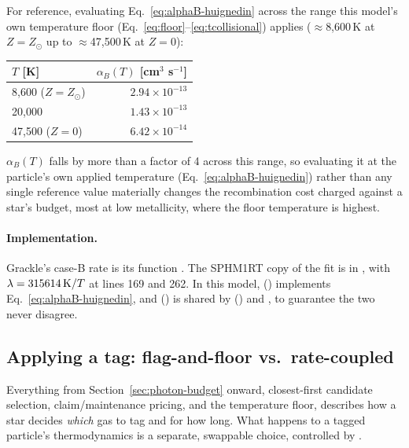 For reference, evaluating Eq.~\ref{eq:alphaB-huignedin} across the
range this model's own temperature floor
(Eq.~\ref{eq:floor}--\ref{eq:tcollisional}) applies
($\approx$8,600\,K at $Z=Z_\odot$ up to $\approx$47,500\,K at $Z=0$):
\begin{center}
\begin{tabular}{lr}
  \hline
  $T$ [K] & $\alpha_B(T)$ [cm$^3$ s$^{-1}$] \\
  \hline
  8,600 ($Z=Z_\odot$)  & $2.94\times10^{-13}$ \\
  20,000               & $1.43\times10^{-13}$ \\
  47,500 ($Z=0$)        & $6.42\times10^{-14}$ \\
  \hline
\end{tabular}
\end{center}
$\alpha_B(T)$ falls by more than a factor of 4 across this range, so
evaluating it at the particle's own applied temperature
(Eq.~\ref{eq:alphaB-huignedin}) rather than any single reference value
materially changes the recombination cost charged against a star's
budget, most at low metallicity, where the floor temperature is
highest.

\paragraph{Implementation.} Grackle's case-B rate is its function
. The SPHM1RT copy of the fit is in
, with $\lambda = 315614\,{\rm K}/T$
at lines 169 and 262. In this model,
() implements
Eq.~\ref{eq:alphaB-huignedin}, and
() is shared by
() and , to
guarantee the two never disagree.

\subsection{Applying a tag: flag-and-floor vs.\ rate-coupled}
\label{sec:rate-coupled}

Everything from Section~\ref{sec:photon-budget} onward, closest-first
candidate selection, claim/maintenance pricing, and the temperature
floor, describes how a star decides \emph{which} gas to tag and for
how long. What happens to a tagged particle's thermodynamics is a
separate, swappable choice, controlled by
.

